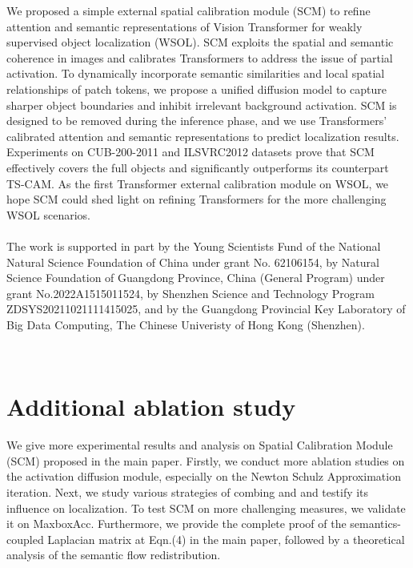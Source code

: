 \documentclass[runningheads]{llncs}
\begin{document}
We proposed a simple external spatial calibration module (SCM) to refine attention and semantic representations of Vision Transformer for weakly supervised object localization (WSOL). 
SCM exploits the spatial and semantic coherence in images and calibrates Transformers to address the issue of partial activation. To dynamically incorporate semantic similarities and local spatial relationships of patch tokens, we propose a unified diffusion model to capture sharper object boundaries and inhibit irrelevant background activation.
SCM is designed to be removed during the inference phase, and we use  Transformers' calibrated attention and semantic representations to predict localization results.
Experiments on CUB-200-2011 and ILSVRC2012 datasets prove that SCM effectively covers the full objects and significantly outperforms its counterpart TS-CAM. 
As the first Transformer external calibration module on WSOL, we hope SCM could shed light on refining Transformers for the more challenging WSOL scenarios.
\\ \hspace*{\fill} \\
 The work is supported in part by the Young Scientists Fund of the National Natural Science Foundation of China under grant No. 62106154, 
by Natural Science Foundation of Guangdong Province, China (General Program) under grant No.2022A1515011524, 
by Shenzhen Science and Technology Program ZDSYS20211021111415025,
and by the Guangdong Provincial Key Laboratory of Big Data Computing, The Chinese Univeristy of Hong Kong
(Shenzhen).



\
\clearpage





\clearpage

\appendix
\section{Additional ablation study}
We give more experimental results and analysis on Spatial Calibration Module (SCM) proposed in the main paper. Firstly, we conduct more ablation studies on the activation diffusion module, especially on the Newton Schulz Approximation iteration. Next, we study various strategies of combing  and  and testify its influence on localization. To test SCM on more challenging measures, we validate it on MaxboxAcc. Furthermore, we provide the complete proof of the semantics-coupled Laplacian matrix  at Eqn.(4) in the main paper, followed by a theoretical analysis of the semantic flow redistribution. 
\end{document}
